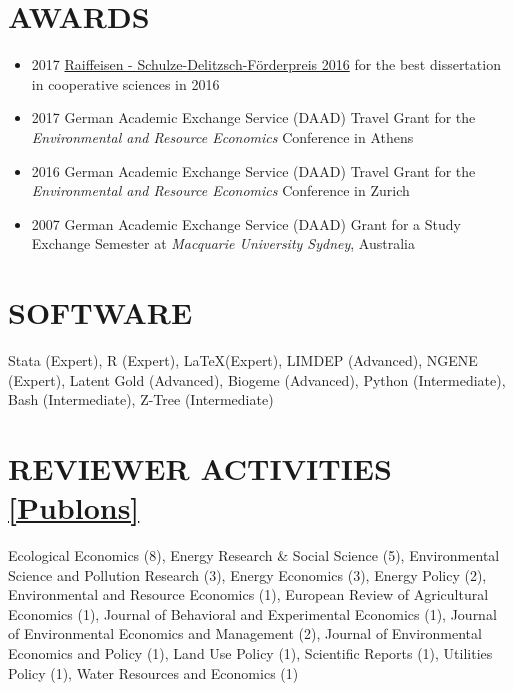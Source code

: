\documentclass[paper=a4,fontsize=11pt]{scrartcl} %
\newcommand{\NewPart}[2]{\section*{\uppercase{#1} #2}}
\begin{document}
 \NewPart{Awards}{}
 \begin{itemize}
\item 2017 \href{https://www.agrar.hu-berlin.de/de/institut/departments/daoe/koopwiss/ifg/forschung/wissenschaftlicher-nachwuchs/raiffeisen-schulze-delitzsch-foerderpreis}{Raiffeisen - Schulze-Delitzsch-Förderpreis 2016} for the best dissertation in cooperative sciences in 2016
 \item 2017 German Academic Exchange Service (DAAD) Travel Grant for the \textit{Environmental and Resource Economics} Conference in Athens
 \item 2016 German Academic Exchange Service (DAAD) Travel Grant for the \textit{Environmental and Resource Economics} Conference in Zurich
 \item 2007 German Academic Exchange Service (DAAD) Grant for a Study Exchange Semester at \textit{Macquarie University Sydney}, Australia

\end{itemize}





\NewPart{Software}{}
Stata (Expert), R (Expert), \LaTeX (Expert),  LIMDEP (Advanced), NGENE (Expert), Latent Gold (Advanced), Biogeme (Advanced), Python (Intermediate), Bash (Intermediate), Z-Tree (Intermediate)

\NewPart{Reviewer Activities}{\href{https://publons.com/a/1337890}{[Publons]}}
 Ecological Economics (8), Energy Research \& Social Science (5), 
Environmental Science and Pollution Research (3), 
Energy Economics (3), 
Energy Policy (2),
 Environmental and Resource Economics (1), European Review of Agricultural Economics (1), Journal of Behavioral and Experimental Economics (1), 
Journal of Environmental Economics and Management 
(2), Journal of Environmental Economics and Policy
(1), Land Use Policy
(1), Scientific Reports
(1), Utilities Policy
(1), Water Resources and Economics (1)
\end{document}
